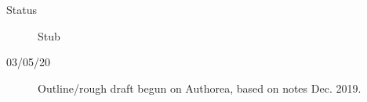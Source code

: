 \begin{description}
\item [{Status}] Stub
\item [{03/05/20}] Outline/rough draft begun on Authorea, based on notes Dec. 2019.
\end{description}